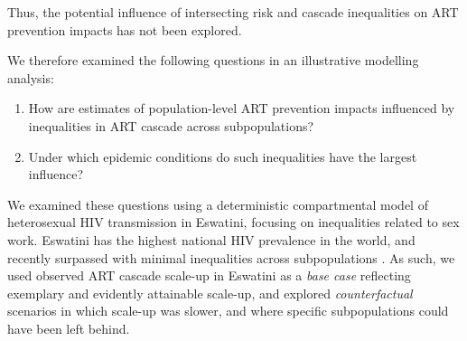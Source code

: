 Thus, the potential influence of intersecting risk and cascade inequalities
on ART prevention impacts has not been explored.
\par
We therefore examined the following questions in an illustrative modelling analysis:
\begin{enumerate}
  \item\label{obj:art.1} How are estimates of population-level ART prevention impacts
    influenced by inequalities in ART cascade across subpopulations?
  \item\label{obj:art.2} Under which epidemic conditions
    do such inequalities have the largest influence?
\end{enumerate}
We examined these questions using
a deterministic compartmental model of heterosexual HIV transmission in Eswatini,
focusing on inequalities related to sex work.
Eswatini has the highest national HIV prevalence in the world,
and recently surpassed \cashi with minimal inequalities across subpopulations
\cite{SHIMS3,UNAIDS2023}.
As such, we used observed ART cascade scale-up in Eswatini as a \emph{base case}
reflecting exemplary and evidently attainable scale-up,
and explored \emph{counterfactual} scenarios in which scale-up was slower,
and where specific subpopulations could have been left behind.
